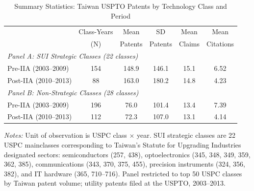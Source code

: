\begin{table}[htbp]
\centering
\caption{Summary Statistics: Taiwan USPTO Patents by Technology Class and Period}
\label{tab:sumstats}
\begin{tabular}{lccccc}
\toprule
& Class-Years & Mean & SD & Mean & Mean \\
& (N) & Patents & Patents & Claims & Citations \\
\midrule
\multicolumn{6}{l}{\textit{Panel A: SUI Strategic Classes (22 classes)}} \\[3pt]
Pre-IIA (2003--2009) & 154 & 148.9 & 146.1 & 15.1 & 6.52 \\
Post-IIA (2010--2013) & 88 & 163.0 & 180.2 & 14.8 & 4.23 \\[6pt]
\multicolumn{6}{l}{\textit{Panel B: Non-Strategic Classes (28 classes)}} \\[3pt]
Pre-IIA (2003--2009) & 196 & 76.0 & 101.4 & 13.4 & 7.39 \\
Post-IIA (2010--2013) & 112 & 72.3 & 107.0 & 13.1 & 4.14 \\
\bottomrule
\end{tabular}
\begin{tablenotes}
\small
\item \textit{Notes:} Unit of observation is USPC class $\times$ year. SUI strategic classes are 22 USPC mainclasses corresponding to Taiwan's Statute for Upgrading Industries designated sectors: semiconductors (257, 438), optoelectronics (345, 348, 349, 359, 362, 385), communications (343, 370, 375, 455), precision instruments (324, 356, 382), and IT hardware (365, 710--716). Panel restricted to top 50 USPC classes by Taiwan patent volume; utility patents filed at the USPTO, 2003--2013.
\end{tablenotes}
\end{table}
